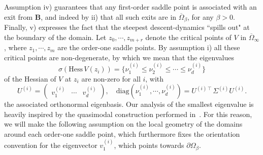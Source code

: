 \documentclass[10pt]{article}
\newcommand{\Hess}{\mathrm{Hess}\,}
\newcommand{\1}{\mathbbm 1}
\begin{document}
    Assumption iv) guarantees that any first-order saddle point is associated with an exit from $\mathbf B$, and indeed by ii) that all such exits are in $\overline\Omega_\beta$, for any $\beta>0$.
    Finally, v) expresses the fact that the steepest descent-dynamics ``spills out" at the boundary of the domain.
    Let $z_0,\dotsm,z_{m+r}$ denote the critical points of $V$ in $\overline{\Omega}_\infty$, where $z_1,\dotsm,z_m$ are the order-one saddle points. 
    By assumption i) all these critical points are non-degenerate, by which we mean that the eigenvalues
    \begin{equation}
        \label{eq:eigvals_hessian}
        \sigma(\Hess V(z_i)) = \{\nu_1^{(i)} \leq \nu_2^{(i)} \leq \dotsm \leq \nu_d^{(i)}\}
    \end{equation}
    of the Hessian of $V$ at $z_i$ are non-zero for all $i$, with
    \begin{equation}
        \label{eq:eigvecs_hessian}
        U^{(i)} =\begin{pmatrix}v_1^{(i)}&\dotsm&v_d^{(i)}\end{pmatrix},\quad \mathrm{diag}(\nu_1^{(i)},\dotsm,\nu_d^{(i)}) = U^{(i)\intercal} \Sigma^{(i)} U^{(i)}.
    \end{equation}
    the associated orthonormal eigenbasis.
    Our analysis of the smallest eigenvalue is heavily inspired by the quasimodal construction performed in~\cite{LPN21}. For this reason, we will make the following assumption on the local geometry of the domains around each order-one saddle point, which furthermore fixes the orientation convention for the eigenvector $v_1^{(i)}$, which points towards $\partial \Omega_\beta$.
    
\end{document}
